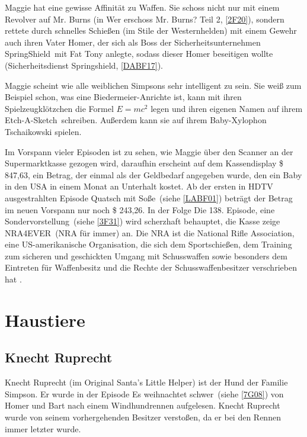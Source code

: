 Maggie hat eine gewisse Affinität zu Waffen. Sie schoss nicht nur mit einem Revolver auf Mr. Burns (in \glqq Wer erschoss Mr. Burns? Teil 2\grqq , \ref{2F20}), sondern rettete durch schnelles Schießen (im Stile der Westernhelden) mit einem Gewehr auch ihren Vater Homer, der sich als Boss der Sicherheitsunternehmen \glqq SpringShield\grqq\ mit Fat Tony anlegte, sodass dieser Homer beseitigen wollte (\glqq Sicherheitsdienst Springshield\grqq , \ref{DABF17}).

Maggie scheint wie alle weiblichen Simpsons sehr intelligent zu sein. Sie weiß zum Beispiel schon, was eine Biedermeier-Anrichte ist, kann mit ihren Spielzeugklötzchen die Formel $E = mc^2$ legen und ihren eigenen Namen auf ihrem \glqq Etch-A-Sketch\grqq\ schreiben. Außerdem kann sie auf ihrem Baby-Xylophon Tschaikowski spielen.

Im Vorspann vieler Episoden ist zu sehen, wie Maggie über den Scanner an der Supermarktkasse gezogen wird, daraufhin erscheint auf dem Kassendisplay \$ 847,63, ein Betrag, der einmal als der Geldbedarf angegeben wurde, den ein Baby in den USA in einem Monat an Unterhalt kostet. Ab der ersten in HDTV ausgestrahlten Episode \glqq Quatsch mit Soße\grqq\ (siehe \ref{LABF01}) beträgt der Betrag im neuen Vorspann nur noch \$ 243,26. In der Folge \glqq Die 138. Episode, eine Sondervorstellung\grqq\ (siehe \ref{3F31}) wird scherzhaft behauptet, die Kasse zeige \glqq NRA4EVER\grqq\ (NRA für immer) an. Die NRA ist die \glqq National Rifle Association\grqq , eine US-amerikanische Organisation, die sich dem Sportschießen, dem Training zum sicheren und geschickten Umgang mit Schusswaffen sowie besonders dem Eintreten für Waffenbesitz und die Rechte der Schusswaffenbesitzer verschrieben hat \cite{KostenBaby}.


\section{Haustiere}

\subsection{Knecht Ruprecht}
Knecht Ruprecht (im Original Santa's Little Helper) ist der Hund der Familie Simpson. Er wurde in der Episode \glqq Es weihnachtet schwer\grqq\ (siehe \ref{7G08}) von Homer und Bart nach einem Windhundrennen \glqq aufgelesen\grqq . Knecht Ruprecht wurde von seinem vorhergehenden Besitzer verstoßen, da er bei den Rennen immer letzter wurde.


